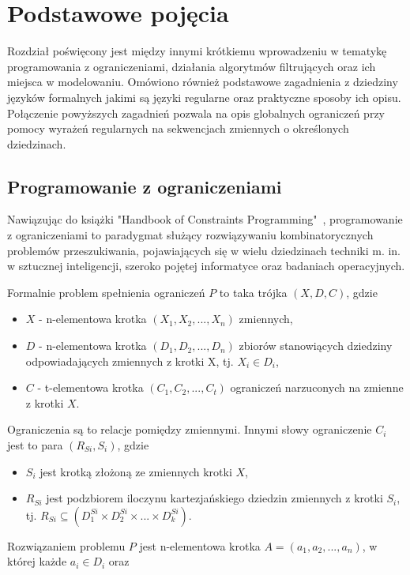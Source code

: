 \chapter{Podstawowe pojęcia}
\thispagestyle{chapterBeginStyle}
\label{rozdzial1}
Rozdział poświęcony jest między innymi krótkiemu wprowadzeniu w tematykę programowania z ograniczeniami, działania
algorytmów filtrujących oraz ich miejsca w modelowaniu. Omówiono również podstawowe zagadnienia z dziedziny języków
formalnych jakimi są języki regularne oraz praktyczne sposoby ich opisu. Połączenie powyższych zagadnień pozwala
na opis globalnych ograniczeń przy pomocy wyrażeń regularnych na sekwencjach zmiennych o określonych dziedzinach.


\section{Programowanie z ograniczeniami}
\par
Nawiązując do książki "Handbook of Constraints Programming"~\cite{HandbookOfCP}, programowanie z ograniczeniami to
paradygmat służący rozwiązywaniu kombinatorycznych problemów przeszukiwania, pojawiających się w wielu dziedzinach
techniki m. in. w sztucznej inteligencji, szeroko pojętej informatyce oraz badaniach operacyjnych.
\par
Formalnie problem spełnienia ograniczeń $P$ to taka trójka $(X, D, C)$, gdzie 
\begin{itemize}
    \item $X$ - n-elementowa krotka $(X_1, X_2, ... , X_n)$ zmiennych,
    \item $D$ - n-elementowa krotka $(D_1, D_2, ... , D_n)$ zbiorów stanowiących dziedziny odpowiadających zmiennych z
                krotki X, tj. $X_i \in D_i$,
    \item $C$ - t-elementowa krotka $(C_1, C_2, ... , C_t)$ ograniczeń narzuconych na zmienne z krotki $X$.
\end{itemize}
Ograniczenia są to relacje pomiędzy zmiennymi. Innymi słowy ograniczenie $C_i$ jest to para $(R_{Si}, S_i)$, gdzie
\begin{itemize}
    \item $S_i$ jest krotką złożoną ze zmiennych krotki $X$,
    \item $R_{Si}$ jest podzbiorem iloczynu kartezjańskiego dziedzin zmiennych
        z krotki $S_i$, tj. $R_{Si} \subseteq (D_1^{Si} \times D_2^{Si} \times ... \times D_k^{Si})$.
\end{itemize}
Rozwiązaniem problemu $P$ jest n-elementowa krotka $A = (a_1, a_2, ... , a_n)$, w której każde $a_i \in D_i$ oraz
